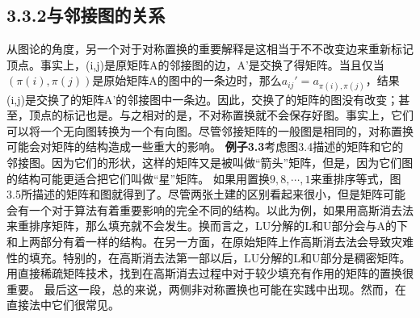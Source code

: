 \documentclass{article}
\begin{document}
\subsection*{3.3.2与邻接图的关系}
从图论的角度，另一个对于对称置换的重要解释是这相当于不不改变边来重新标记顶点。事实上，(i,j)是原矩阵A的邻接图的边，A'是交换了得矩阵。当且仅当$(\pi(i),\pi(j))$是原始矩阵A的图中的一条边时，那么$a_{ij}'=a_{\pi(i),\pi(j)}$，结果(i,j)是交换了的矩阵A'的邻接图中一条边。因此，交换了的矩阵的图没有改变；甚至，顶点的标记也是。与之相对的是，不对称置换就不会保存好图。事实上，它们可以将一个无向图转换为一个有向图。尽管邻接矩阵的一般图是相同的，对称置换可能会对矩阵的结构造成一些重大的影响。
\newline
\textbf{例子3.3}考虑图3.4描述的矩阵和它的邻接图。因为它们的形状，这样的矩阵又是被叫做“箭头”矩阵，但是，因为它们图的结构可能更适合把它们叫做“星”矩阵。
\newline
如果用置换$9,8,\cdots,1$来重排序等式，图3.5所描述的矩阵和图就得到了。尽管两张土建的区别看起来很小，但是矩阵可能会有一个对于算法有着重要影响的完全不同的结构。以此为例，如果用高斯消去法来重排序矩阵，那么填充就不会发生。换而言之，LU分解的L和U部分会与A的下和上两部分有着一样的结构。在另一方面，在原始矩阵上作高斯消去法会导致灾难性的填充。特别的，在高斯消去法第一部以后，LU分解的L和U部分是稠密矩阵。用直接稀疏矩阵技术，找到在高斯消去过程中对于较少填充有作用的矩阵的置换很重要。
\newline
最后这一段，总的来说，两侧非对称置换也可能在实践中出现。然而，在直接法中它们很常见。
\end{document}
